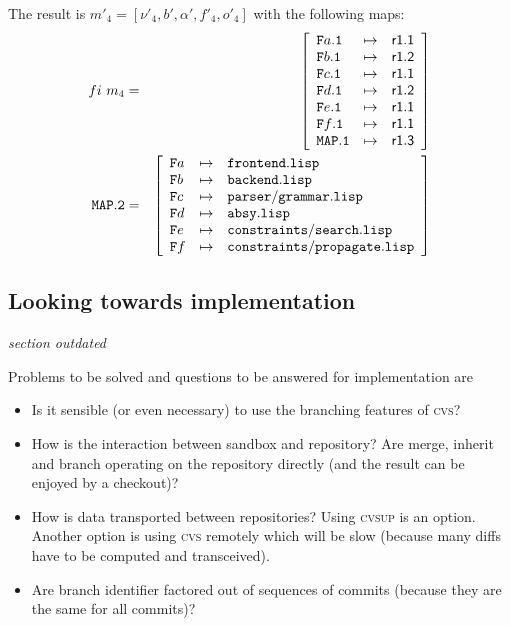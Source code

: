\documentclass[fleqn, 10pt, a4paper]{article}
\begin{document}
The result is $m'_4=[\nu'_4, b', \alpha', f'_4, o'_4]$ with the
following maps:
\begin{eqnarray*}
\mathnormal{fi}\ m_4 &=& \left[
\begin{array}{lcl}
\mathtt{F}a\mathtt{.1} & \mapsto & \mathsf{r1.1} \\
\mathtt{F}b\mathtt{.1} & \mapsto & \mathsf{r1.2} \\
\mathtt{F}c\mathtt{.1} & \mapsto & \mathsf{r1.1} \\
\mathtt{F}d\mathtt{.1} & \mapsto & \mathsf{r1.2} \\
\mathtt{F}e\mathtt{.1} & \mapsto & \mathsf{r1.1} \\
\mathtt{F}f\mathtt{.1} & \mapsto & \mathsf{r1.1} \\
\mathtt{MAP.1}         & \mapsto & \mathsf{r1.3} \\
\end{array}\right] \\
\mathtt{MAP.2} &=& \left[
\begin{array}{lcl}
\mathtt{F}a &\mapsto& \mathtt{frontend.lisp} \\
\mathtt{F}b &\mapsto& \mathtt{backend.lisp} \\
\mathtt{F}c &\mapsto& \mathtt{parser/grammar.lisp} \\
\mathtt{F}d &\mapsto& \mathtt{absy.lisp} \\
\mathtt{F}e &\mapsto& \mathtt{constraints/search.lisp} \\
\mathtt{F}f &\mapsto& \mathtt{constraints/propagate.lisp} \\
\end{array}\right]
\end{eqnarray*}


\subsection{Looking towards implementation}
\emph{section outdated}

Problems to be solved and questions to be answered for implementation
are

\begin{itemize}
\item Is it sensible (or even necessary) to use the branching features
of \textsc{cvs}?
\item How is the interaction between sandbox and repository? Are merge,
inherit and branch operating on the repository directly (and the result
can be enjoyed by a checkout)?
\item How is data transported between repositories? Using \textsc{cvsup}
is an option. Another option is using \textsc{cvs} remotely which will be
slow (because many diffs have to be computed and transceived).
\item Are branch identifier factored out of sequences of commits (because
they are the same for all commits)?
\end{itemize}
\end{document}
